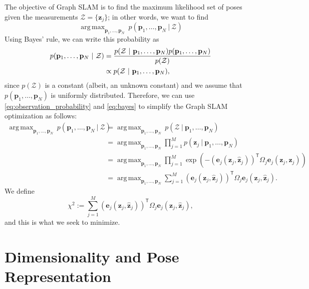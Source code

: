\documentclass{article}
\DeclareMathOperator*{\argmax}{arg\,max}
\newcommand{\transp}{{\scriptstyle{\mathsf{T}}}}
\begin{document}
The objective of Graph SLAM is to find the maximum likelihood set of poses given the measurements $\mathcal{Z} = \{\mathbf{z}_j\}$; in other words, we want to find 
%
\begin{equation*}
    \argmax_{\mathbf{p}_1, \ldots, \mathbf{p}_N} \ p(\mathbf{p}_1, \ldots, \mathbf{p}_N \ | \ \mathcal{Z}) 
\end{equation*}
%
Using Bayes' rule, we can write this probability as
%
\begin{align}
    p(\mathbf{p}_1, \ldots, \mathbf{p}_N \ | \ \mathcal{Z}) &= \frac{p( \mathcal{Z} \ | \ \mathbf{p}_1, \ldots, \mathbf{p}_N) p(\mathbf{p}_1, \ldots, \mathbf{p}_N) }{ p(\mathcal{Z}) } \notag \\
    &\propto p( \mathcal{Z} \ | \ \mathbf{p}_1, \ldots, \mathbf{p}_N), \label{eq:bayes}
\end{align}
%
since $p(\mathcal{Z})$ is a constant (albeit, an unknown constant) and we assume that $p(\mathbf{p}_1, \ldots, \mathbf{p}_N)$ is uniformly distributed.  Therefore, we can use \eqref{eq:observation_probability} and \eqref{eq:bayes} to simplify the Graph SLAM optimization as follows:
%
\begin{align*}
    \argmax_{\mathbf{p}_1, \ldots, \mathbf{p}_N} \ p(\mathbf{p}_1, \ldots, \mathbf{p}_N \ | \ \mathcal{Z}) &= \argmax_{\mathbf{p}_1, \ldots, \mathbf{p}_N} \ p( \mathcal{Z} \ | \ \mathbf{p}_1, \ldots, \mathbf{p}_N) \\
    &= \argmax_{\mathbf{p}_1, \ldots, \mathbf{p}_N} \prod_{j=1}^M p(\mathbf{z}_j \ | \ \mathbf{p}_1, \ldots, \mathbf{p}_N) \\
    &= \argmax_{\mathbf{p}_1, \ldots, \mathbf{p}_N} \prod_{j=1}^M \exp \left( -(\mathbf{e}_j(\mathbf{z}_j, \hat{\mathbf{z}}_j))^\transp \Omega_j \mathbf{e}_j(\mathbf{z}_j, \hat{\mathbf{z}}_j) \right) \\
    &= \argmax_{\mathbf{p}_1, \ldots, \mathbf{p}_N} \sum_{j=1}^M (\mathbf{e}_j(\mathbf{z}_j, \hat{\mathbf{z}}_j))^\transp \Omega_j \mathbf{e}_j(\mathbf{z}_j, \hat{\mathbf{z}}_j).
\end{align*}
%
We define
%
\begin{equation*}
    \chi^2 := \sum_{j=1}^M (\mathbf{e}_j(\mathbf{z}_j, \hat{\mathbf{z}}_j))^\transp \Omega_j \mathbf{e}_j(\mathbf{z}_j, \hat{\mathbf{z}}_j),
\end{equation*}
%
and this is what we seek to minimize.


\section{Dimensionality and Pose Representation}
\end{document}
